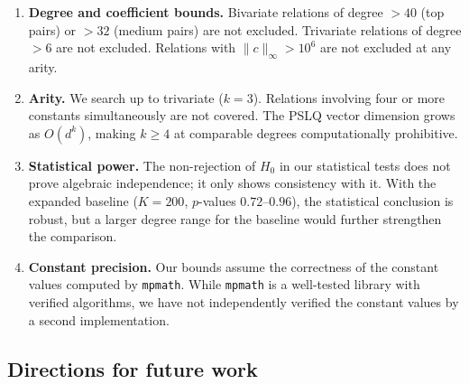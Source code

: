 \documentclass[11pt]{amsart}
\theoremstyle{remark}
\newcommand{\norm}[1]{\lVert #1 \rVert}
\begin{document}
\begin{enumerate}
\item \textbf{Degree and coefficient bounds.} Bivariate relations of degree ${}>40$
  (top pairs) or ${}>32$ (medium pairs) are not excluded. Trivariate relations of
  degree ${}>6$ are not excluded. Relations with $\norm{c}_\infty>10^6$ are not
  excluded at any arity.

\item \textbf{Arity.} We search up to trivariate ($k=3$). Relations involving four
  or more constants simultaneously are not covered. The PSLQ vector dimension grows
  as $O(d^k)$, making $k\ge 4$ at comparable degrees computationally prohibitive.

\item \textbf{Statistical power.} The non-rejection of $H_0$ in our statistical
  tests does not prove algebraic independence; it only shows consistency with it.
  With the expanded baseline ($K=200$, $p$-values $0.72$--$0.96$), the
  statistical conclusion is robust, but a larger degree range for the
  baseline would further strengthen the comparison.

\item \textbf{Constant precision.} Our bounds assume the correctness of the constant
  values computed by \texttt{mpmath}. While \texttt{mpmath} is a well-tested library
  with verified algorithms, we have not independently verified the constant values by
  a second implementation.
\end{enumerate}

\subsection{Directions for future work}\label{ssec:future}
\end{document}
